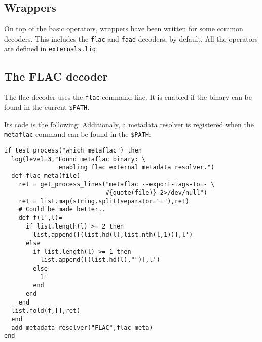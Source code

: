 \subsection{Wrappers}
On top of the basic operators, wrappers have been written for some common
decoders. This includes the \verb+flac+ and \verb+faad+ decoders, by
default. All the operators are defined in \verb+externals.liq+.

\subsection{The FLAC decoder}
The flac decoder uses the \verb+flac+ command line. It is enabled if the binary
can be found in the current \verb+$PATH+.

Its code is the following:
Additionaly, a metadata resolver is registered when the \verb+metaflac+ command
can be found in the \verb+$PATH+:

\begin{verbatim}
if test_process("which metaflac") then
  log(level=3,"Found metaflac binary: \
               enabling flac external metadata resolver.")
  def flac_meta(file)
    ret = get_process_lines("metaflac --export-tags-to=- \
                            #{quote(file)} 2>/dev/null")
    ret = list.map(string.split(separator="="),ret)
    # Could be made better..
    def f(l',l)=
      if list.length(l) >= 2 then
        list.append([(list.hd(l),list.nth(l,1))],l')
      else
        if list.length(l) >= 1 then
          list.append([(list.hd(l),"")],l')
        else
          l'
        end
      end
    end
  list.fold(f,[],ret)
  end
  add_metadata_resolver("FLAC",flac_meta)
end
\end{verbatim}

